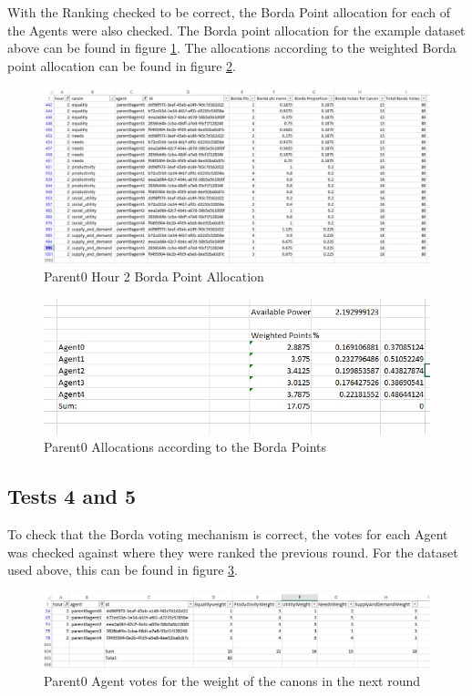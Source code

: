 With the Ranking checked to be correct, the Borda Point allocation for each of the Agents were also checked. The Borda point allocation for the example dataset above can be found in figure \ref{fig:test7}.  The allocations according to the weighted Borda point allocation can be found in figure \ref{fig:test8}.

\begin{figure}[h!]
	\centering
	\includegraphics[scale=0.33]{Images/test-allocation3(BordaPtAllocation).png}
	\caption{Parent0 Hour 2 Borda Point Allocation}
	\label{fig:test7}
\end{figure}

\begin{figure}[h!]
	\centering
	\includegraphics[scale=0.4]{Images/test-allocation3(FinalAllocation).png}
	\caption{Parent0 Allocations according to the Borda Points}
	\label{fig:test8}
\end{figure}

\clearpage

\subsection*{Tests 4 and 5}
To check that the Borda voting mechanism is correct, the votes for each Agent was checked against where they were ranked the previous round. For the dataset used above, this can be found in figure \ref{fig:bordavoting}.

\begin{figure}[h!]
	\centering
	\includegraphics[scale=0.34]{Images/test-allocation3(Voting).png}
	\caption{Parent0 Agent votes for the weight of the canons in the next round}
	\label{fig:bordavoting}
\end{figure}

